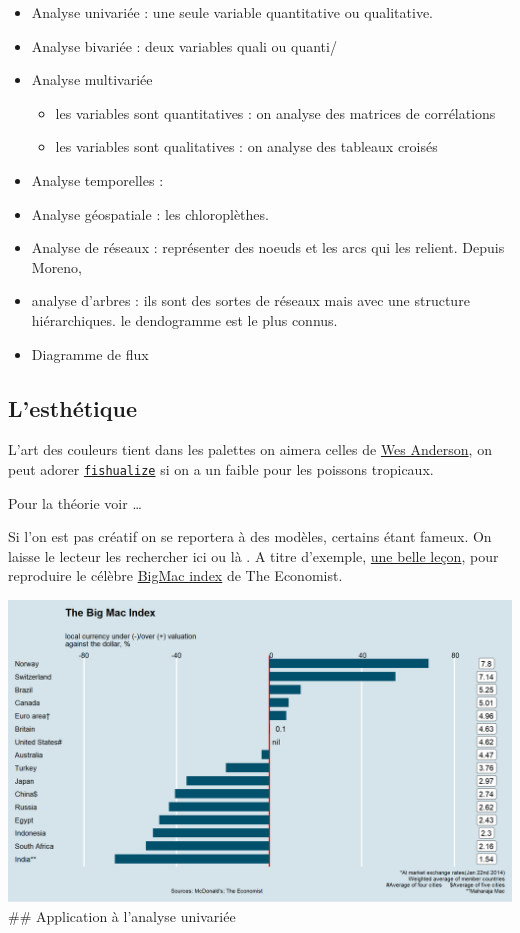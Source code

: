\documentclass[
]{book}
\providecommand{\tightlist}{%
  \setlength{\itemsep}{0pt}\setlength{\parskip}{0pt}}
\begin{document}
\begin{itemize}
\tightlist
\item
  Analyse univariée : une seule variable quantitative ou qualitative.
\item
  Analyse bivariée : deux variables quali ou quanti/
\item
  Analyse multivariée

  \begin{itemize}
  \tightlist
  \item
    les variables sont quantitatives : on analyse des matrices de corrélations
  \item
    les variables sont qualitatives : on analyse des tableaux croisés
  \end{itemize}
\item
  Analyse temporelles :
\item
  Analyse géospatiale : les chloroplèthes.
\item
  Analyse de réseaux : représenter des noeuds et les arcs qui les relient. Depuis Moreno,
\item
  analyse d'arbres : ils sont des sortes de réseaux mais avec une structure hiérarchiques. le dendogramme est le plus connus.
\item
  Diagramme de flux
\end{itemize}

\hypertarget{lesthuxe9tique}{%
\subsection{L'esthétique}\label{lesthuxe9tique}}

L'art des couleurs tient dans les palettes on aimera celles de \href{https://github.com/karthik/wesanderson}{Wes Anderson}, on peut adorer \href{https://nschiett.github.io/fishualize/index.html}{\texttt{fishualize}} si on a un faible pour les poissons tropicaux.

Pour la théorie voir \ldots{}

Si l'on est pas créatif on se reportera à des modèles, certains étant fameux. On laisse le lecteur les rechercher ici ou là . A titre d'exemple, \href{https://rpubs.com/ysittaa/BMIsitta}{une belle leçon}, pour reproduire le célèbre \href{https://www.economist.com/big-mac-index}{BigMac index} de The Economist.

\includegraphics{./Images/Bigmacindex.png}
\#\# Application à l'analyse univariée
\end{document}
